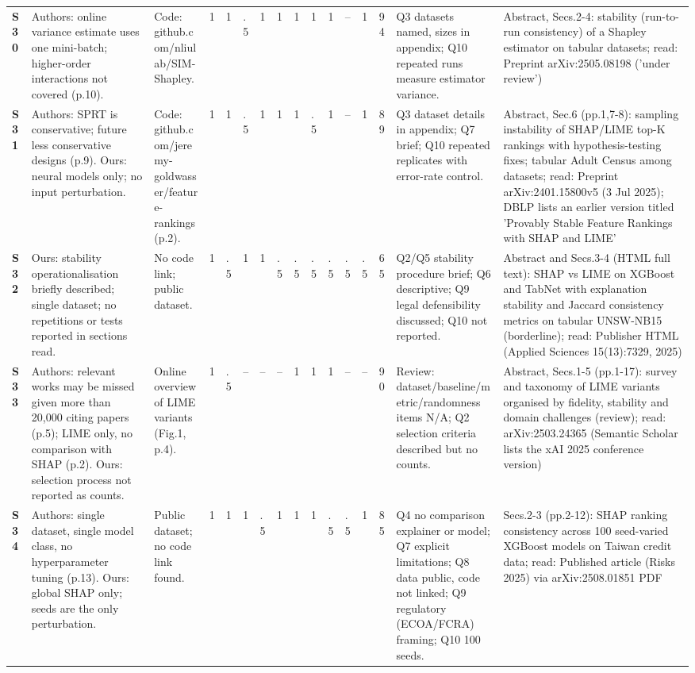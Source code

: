 \begin{longtable}{@{}P{1.0cm}P{4.6cm}P{3.6cm}P{0.3cm}P{0.3cm}P{0.3cm}P{0.3cm}P{0.3cm}P{0.3cm}P{0.3cm}P{0.3cm}P{0.3cm}P{0.36cm}P{0.75cm}P{3.0cm}P{3.9cm}@{}}
\textbf{S30} & Authors: online variance estimate uses one mini-batch; higher-order interactions not covered (p.10). & Code: github.com/\allowbreak{}nliulab/\allowbreak{}SIM-Shapley. & 1 & 1 & .5 & 1 & 1 & 1 & 1 & 1 & -- & 1 & 94 & Q3 datasets named, sizes in appendix; Q10 repeated runs measure estimator variance. & Abstract, Secs.2-4: stability (run-to-run consistency) of a Shapley estimator on tabular datasets; read: Preprint arXiv:2505.08198 ('under review') \\
\textbf{S31} & Authors: SPRT is conservative; future less conservative designs (p.9). Ours: neural models only; no input perturbation. & Code: github.com/\allowbreak{}jeremy-goldwasser/\allowbreak{}feature-rankings (p.2). & 1 & 1 & .5 & 1 & 1 & 1 & .5 & 1 & -- & 1 & 89 & Q3 dataset details in appendix; Q7 brief; Q10 repeated replicates with error-rate control. & Abstract, Sec.6 (pp.1,7-8): sampling instability of SHAP/\allowbreak{}LIME top-K rankings with hypothesis-testing fixes; tabular Adult Census among datasets; read: Preprint arXiv:2401.15800v5 (3 Jul 2025); DBLP lists an earlier version titled 'Provably Stable Feature Rankings with SHAP and LIME' \\
\textbf{S32} & Ours: stability operationalisation briefly described; single dataset; no repetitions or tests reported in sections read. & No code link; public dataset. & 1 & .5 & 1 & 1 & .5 & .5 & .5 & .5 & .5 & .5 & 65 & Q2/\allowbreak{}Q5 stability procedure brief; Q6 descriptive; Q9 legal defensibility discussed; Q10 not reported. & Abstract and Secs.3-4 (HTML full text): SHAP vs LIME on XGBoost and TabNet with explanation stability and Jaccard consistency metrics on tabular UNSW-NB15 (borderline); read: Publisher HTML (Applied Sciences 15(13):7329, 2025) \\
\textbf{S33} & Authors: relevant works may be missed given more than 20,000 citing papers (p.5); LIME only, no comparison with SHAP (p.2). Ours: selection process not reported as counts. & Online overview of LIME variants (Fig.1, p.4). & 1 & .5 & -- & -- & -- & 1 & 1 & 1 & -- & -- & 90 & Review: dataset/\allowbreak{}baseline/\allowbreak{}metric/\allowbreak{}randomness items N/\allowbreak{}A; Q2 selection criteria described but no counts. & Abstract, Secs.1-5 (pp.1-17): survey and taxonomy of LIME variants organised by fidelity, stability and domain challenges (review); read: arXiv:2503.24365 (Semantic Scholar lists the xAI 2025 conference version) \\
\textbf{S34} & Authors: single dataset, single model class, no hyperparameter tuning (p.13). Ours: global SHAP only; seeds are the only perturbation. & Public dataset; no code link found. & 1 & 1 & 1 & .5 & 1 & 1 & 1 & .5 & .5 & 1 & 85 & Q4 no comparison explainer or model; Q7 explicit limitations; Q8 data public, code not linked; Q9 regulatory (ECOA/\allowbreak{}FCRA) framing; Q10 100 seeds. & Secs.2-3 (pp.2-12): SHAP ranking consistency across 100 seed-varied XGBoost models on Taiwan credit data; read: Published article (Risks 2025) via arXiv:2508.01851 PDF \\

\end{longtable}
